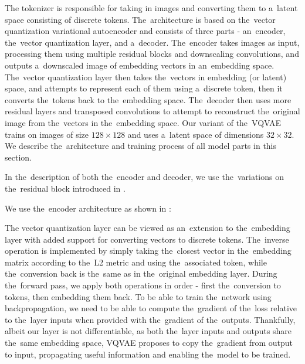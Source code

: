 The tokenizer is responsible for taking in images and converting them to a~latent space consisting of discrete tokens. The~architecture is based on the~vector quantization variational autoencoder \citep{vqvae} and consists of three parts - an~encoder, the~vector quantization layer, and a~decoder. The~encoder takes images as input, processing them using multiple residual blocks and downscaling convolutions, and outputs a~downscaled image of embedding vectors in an~embedding space. The~vector quantization layer then takes the~vectors in embedding (or latent) space, and attempts to represent each of them using a~discrete token, then it converts the~tokens back to the~embedding space. The~decoder then uses more residual layers and transposed convolutions to attempt to reconstruct the~original image from the~vectors in the~embedding space. Our variant of the~VQVAE trains on images of size $128 \times 128$ and uses a~latent space of dimensions $32 \times 32$. We describe the~architecture and training process of all model parts in this section.

In the~description of both the~encoder and decoder, we use the~variations on the~residual block introduced in .


We use the~encoder architecture as shown in :



The vector quantization layer can be viewed as an~extension to the~embedding layer with added support for converting vectors to discrete tokens. The~inverse operation is implemented by simply taking the~closest vector in the~embedding matrix according to the~L2 metric and using the~associated token, while the~conversion back is the~same as in the~original embedding layer. During the~forward pass, we apply both operations in order - first the~conversion to tokens, then embedding them back. To be able to train the~network using backpropagation, we need to be able to compute the~gradient of the~loss relative to the~layer inputs when provided with the~gradient of the~outputs. Thankfully, albeit our layer is not differentiable, as both the~layer inputs and outputs share the~same embedding space, VQVAE proposes to copy the~gradient from output to input, propagating useful information and enabling the~model to be trained.


